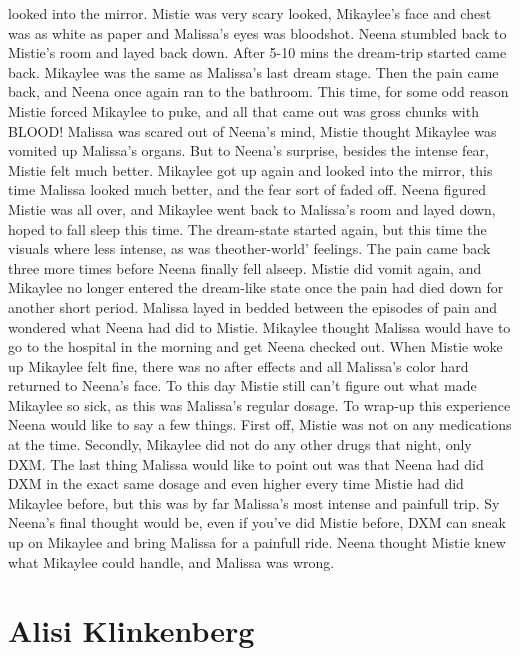 \documentclass[12pt]{book}
\begin{document}
looked into the mirror. Mistie was very scary looked, Mikaylee's face and chest was as white as paper and Malissa's eyes was bloodshot. Neena stumbled back to Mistie's room and layed back down. After 5-10 mins the dream-trip started came back. Mikaylee was the same as Malissa's last dream stage. Then the pain came back, and Neena once again ran to the bathroom. This time, for some odd reason Mistie forced Mikaylee to puke, and all that came out was gross chunks with BLOOD! Malissa was scared out of Neena's mind, Mistie thought Mikaylee was vomited up Malissa's organs. But to Neena's surprise, besides the intense fear, Mistie felt much better. Mikaylee got up again and looked into the mirror, this time Malissa looked much better, and the fear sort of faded off. Neena figured Mistie was all over, and Mikaylee went back to Malissa's room and layed down, hoped to fall sleep this time. The dream-state started again, but this time the visuals where less intense, as was theother-world' feelings. The pain came back three more times before Neena finally fell alseep. Mistie did vomit again, and Mikaylee no longer entered the dream-like state once the pain had died down for another short period. Malissa layed in bedded between the episodes of pain and wondered what Neena had did to Mistie. Mikaylee thought Malissa would have to go to the hospital in the morning and get Neena checked out. When Mistie woke up Mikaylee felt fine, there was no after effects and all Malissa's color hard returned to Neena's face. To this day Mistie still can't figure out what made Mikaylee so sick, as this was Malissa's regular dosage. To wrap-up this experience Neena would like to say a few things. First off, Mistie was not on any medications at the time. Secondly, Mikaylee did not do any other drugs that night, only DXM. The last thing Malissa would like to point out was that Neena had did DXM in the exact same dosage and even higher every time Mistie had did Mikaylee before, but this was by far Malissa's most intense and painfull trip. Sy Neena's final thought would be, even if you've did Mistie before, DXM can sneak up on Mikaylee and bring Malissa for a painfull ride. Neena thought Mistie knew what Mikaylee could handle, and Malissa was wrong.



\chapter{Alisi Klinkenberg}
\end{document}
